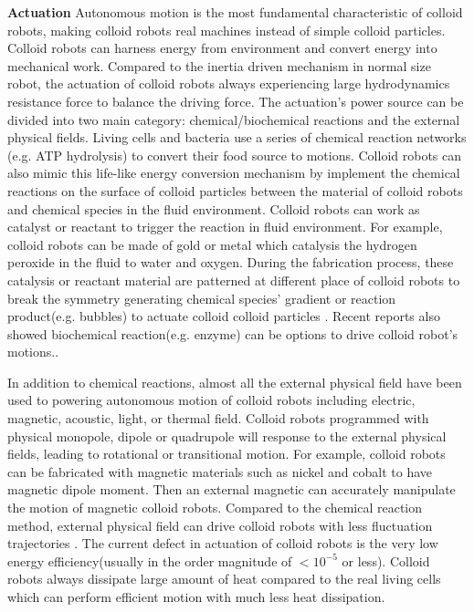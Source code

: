 \textbf{Actuation} Autonomous motion is the most fundamental characteristic of colloid robots, making colloid robots real machines instead of simple colloid particles. Colloid robots can harness energy from environment and convert energy into mechanical work. Compared to the inertia driven mechanism in normal size robot, the actuation of colloid robots always experiencing large hydrodynamics resistance force to balance the driving force. The actuation's power source can be divided into two main category: chemical/biochemical reactions and the external physical fields. Living cells and bacteria use a series of  chemical reaction networks (e.g. ATP hydrolysis) to convert their food source to motions. Colloid robots can also mimic this life-like energy conversion mechanism by implement the chemical reactions on the surface of colloid particles between the material of colloid robots and chemical species in the fluid environment. Colloid robots can work as catalyst or reactant to trigger the reaction in fluid environment. For example,  colloid robots can be made of gold or metal  which catalysis the hydrogen peroxide in the fluid to water and oxygen. During the fabrication process, these catalysis or reactant material are patterned at different place of colloid robots to break the symmetry generating chemical species' gradient or reaction product(e.g. bubbles) to actuate colloid colloid particles \cite{velegol2016origins,shklyaev2016harnessing,parmar2018micro}. Recent reports also showed biochemical reaction(e.g. enzyme) can be options to drive colloid robot's motions.\cite{zhao2018substrate,somasundar2019positive}.

In addition to  chemical reactions, almost all the external physical field have been used to powering autonomous motion of colloid robots including electric\cite{lee2019directed}, magnetic\cite{zhang2009artificial}, acoustic\cite{sabrina2018shape}, light\cite{dai2016programmable}, or thermal field\cite{lozano2016phototaxis}.  Colloid robots programmed with physical monopole, dipole or quadrupole will response to the external physical fields, leading to rotational or transitional motion. For example, colloid robots can be fabricated with magnetic materials such as nickel and cobalt to have magnetic dipole moment. Then an external magnetic can accurately manipulate the motion of magnetic colloid robots. Compared to the  chemical reaction method, external physical field can drive colloid robots with less fluctuation trajectories  \cite{han2018engineering,ren2018two}. 
The current defect in actuation of colloid robots is the very low energy efficiency(usually in the order magnitude of $<10^{-5}$ or less). Colloid robots always dissipate large amount of heat\cite{wang2013understanding} compared to the real living cells which can perform efficient motion with much less heat dissipation.

